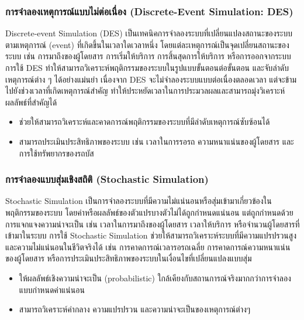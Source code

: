 \subsubsection{การจำลองเหตุการณ์แบบไม่ต่อเนื่อง (Discrete-Event Simulation: DES)}
\begin{mypara}
    \indent Discrete-event Simulation (DES) เป็นเทคนิคการจำลองระบบที่เปลี่ยนแปลงสถานะของระบบตามเหตุการณ์ (event) 
    ที่เกิดขึ้นในเวลาใดเวลาหนึ่ง โดยแต่ละเหตุการณ์เป็นจุดเปลี่ยนสถานะของระบบ 
    เช่น การมาถึงของผู้โดยสาร การเริ่มให้บริการ การสิ้นสุดการให้บริการ หรือการออกจากระบบ 
    การใช้ DES ทำให้สามารถวิเคราะห์พฤติกรรมของระบบในรูปแบบขั้นตอนต่อขั้นตอน 
    และจับลำดับเหตุการณ์ต่าง ๆ ได้อย่างแม่นยำ เนื่องจาก DES จะไม่จำลองระบบแบบต่อเนื่องตลอดเวลา 
    แต่จะข้ามไปยังช่วงเวลาที่เกิดเหตุการณ์สำคัญ ทำให้ประหยัดเวลาในการประมวลผลและสามารถมุ่งวิเคราะห์ผลลัพธ์ที่สำคัญได้
\end{mypara}
\begin{itemize}
  \item ช่วยให้สามารถวิเคราะห์และคาดการณ์พฤติกรรมของระบบที่มีลำดับเหตุการณ์ซับซ้อนได้
  \item สามารถประเมินประสิทธิภาพของระบบ เช่น เวลาในการรอรถ ความหนาแน่นของผู้โดยสาร และการใช้ทรัพยากรของรถบัส
\end{itemize}
\subsubsection{การจำลองแบบสุ่มเชิงสถิติ (Stochastic Simulation)}
\begin{mypara}
    \indent Stochastic Simulation เป็นการจำลองระบบที่มีความไม่แน่นอนหรือสุ่มเข้ามาเกี่ยวข้องในพฤติกรรมของระบบ
    โดยค่าหรือผลลัพธ์ของตัวแปรบางตัวไม่ได้ถูกกำหนดแน่นอน 
    แต่ถูกกำหนดด้วยการแจกแจงความน่าจะเป็น เช่น เวลาในการมาถึงของผู้โดยสาร เวลาให้บริการ 
    หรือจำนวนผู้โดยสารที่เข้ามาในระบบ การใช้ Stochastic Simulation 
    ช่วยให้สามารถวิเคราะห์ระบบที่มีความแปรปรวนสูงและความไม่แน่นอนในชีวิตจริงได้ 
    เช่น การคาดการณ์เวลารอรถเฉลี่ย การคาดการณ์ความหนาแน่นของผู้โดยสาร 
    หรือการประเมินประสิทธิภาพของระบบในเงื่อนไขที่เปลี่ยนแปลงแบบสุ่ม
\end{mypara}
\begin{itemize}
  \item ให้ผลลัพธ์เชิงความน่าจะเป็น (probabilistic) ใกล้เคียงกับสถานการณ์จริงมากกว่าการจำลองแบบกำหนดค่าแน่นอน
  \item สามารถวิเคราะห์ค่ากลาง ความแปรปรวน และความน่าจะเป็นของเหตุการณ์ต่างๆ
\end{itemize}

